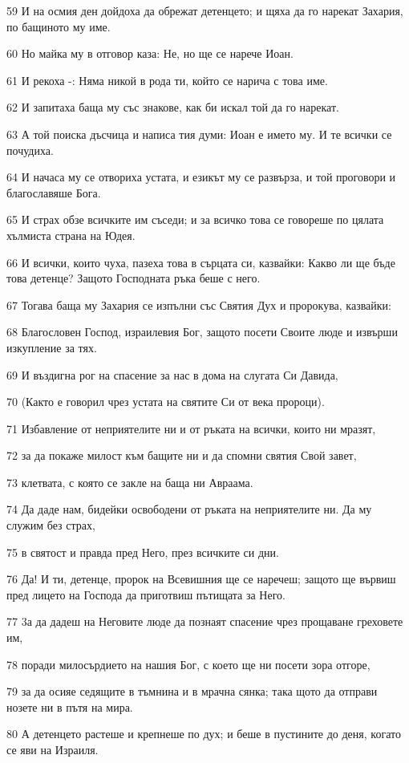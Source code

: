 \par 59 И на осмия ден дойдоха да обрежат детенцето; и щяха да го нарекат Захария, по бащиното му име.
\par 60 Но майка му в отговор каза: Не, но ще се нарече Иоан.
\par 61 И рекоха -: Няма никой в рода ти, който се нарича с това име.
\par 62 И запитаха баща му със знакове, как би искал той да го нарекат.
\par 63 А той поиска дъсчица и написа тия думи: Иоан е името му. И те всички се почудиха.
\par 64 И начаса му се отвориха устата, и езикът му се развърза, и той проговори и благославяше Бога.
\par 65 И страх обзе всичките им съседи; и за всичко това се говореше по цялата хълмиста страна на Юдея.
\par 66 И всички, които чуха, пазеха това в сърцата си, казвайки: Какво ли ще бъде това детенце? Защото Господната ръка беше с него.
\par 67 Тогава баща му Захария се изпълни със Святия Дух и пророкува, казвайки:
\par 68 Благословен Господ, израилевия Бог, защото посети Своите люде и извърши изкупление за тях.
\par 69 И въздигна рог на спасение за нас в дома на слугата Си Давида,
\par 70 (Както е говорил чрез устата на святите Си от века пророци).
\par 71 Избавление от неприятелите ни и от ръката на всички, които ни мразят,
\par 72 за да покаже милост към бащите ни и да спомни святия Свой завет,
\par 73 клетвата, с която се закле на баща ни Авраама.
\par 74 Да даде нам, бидейки освободени от ръката на неприятелите ни. Да му служим без страх,
\par 75 в святост и правда пред Него, през всичките си дни.
\par 76 Да! И ти, детенце, пророк на Всевишния ще се наречеш; защото ще вървиш пред лицето на Господа да приготвиш пътищата за Него.
\par 77 3а да дадеш на Неговите люде да познаят спасение чрез прощаване греховете им,
\par 78 поради милосърдието на нашия Бог, с което ще ни посети зора отгоре,
\par 79 за да осияе седящите в тъмнина и в мрачна сянка; така щото да отправи нозете ни в пътя на мира.
\par 80 А детенцето растеше и крепнеше по дух; и беше в пустините до деня, когато се яви на Израиля.

